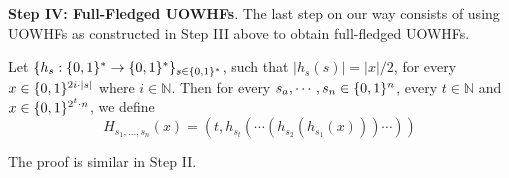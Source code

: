 \noindent\textbf{Step IV: Full-Fledged UOWHFs}. 
The last step on our way consists of using UOWHFs as constructed in Step III above to obtain
full-fledged UOWHFs.
\begin{construction}[(a UOWHF)]
Let $\{h_s:\{0,1\}^{*}\rightarrow\{0,1\}^{*}\}_{s\in\{0,1\}^{*}}$, such that $|h_s(s)|=|x|/2$, for every $x\in\{0,1\}^{2i\cdot|s|}$ where $i\in\mathbb{N}$. Then for every $s_a,\cdots,s_n\in\{0,1\}^{n}$, every $t\in\mathbb{N}$ and $x\in\{0,1\}^{2^t\cdot n}$, we define
\[
    H_{s_1,\dots,s_n}(x)=(t,h_{s_t}(\cdots(h_{s_2}(h_{s_1}(x)))\cdots))
\]
\end{construction}
The proof is similar in Step II. 




